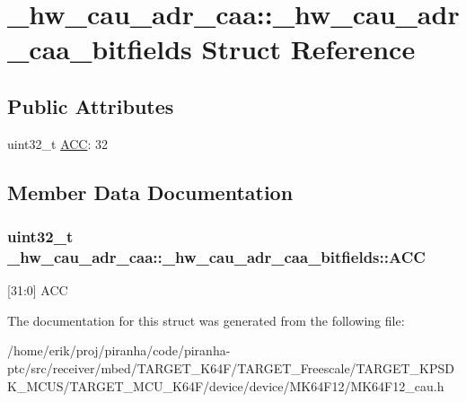 \hypertarget{struct__hw__cau__adr__caa_1_1__hw__cau__adr__caa__bitfields}{}\section{\+\_\+hw\+\_\+cau\+\_\+adr\+\_\+caa\+:\+:\+\_\+hw\+\_\+cau\+\_\+adr\+\_\+caa\+\_\+bitfields Struct Reference}
\label{struct__hw__cau__adr__caa_1_1__hw__cau__adr__caa__bitfields}
\subsection*{Public Attributes}
\begin{DoxyCompactItemize}
\item 
uint32\+\_\+t \hyperlink{struct__hw__cau__adr__caa_1_1__hw__cau__adr__caa__bitfields_ad5e67f03aef2965ab3c8c6d02ae842cf}{A\+CC}\+: 32
\end{DoxyCompactItemize}


\subsection{Member Data Documentation}
\subsubsection[{\texorpdfstring{A\+CC}{ACC}}]{\setlength{\rightskip}{0pt plus 5cm}uint32\+\_\+t \+\_\+hw\+\_\+cau\+\_\+adr\+\_\+caa\+::\+\_\+hw\+\_\+cau\+\_\+adr\+\_\+caa\+\_\+bitfields\+::\+A\+CC}\hypertarget{struct__hw__cau__adr__caa_1_1__hw__cau__adr__caa__bitfields_ad5e67f03aef2965ab3c8c6d02ae842cf}{}\label{struct__hw__cau__adr__caa_1_1__hw__cau__adr__caa__bitfields_ad5e67f03aef2965ab3c8c6d02ae842cf}
\mbox{[}31\+:0\mbox{]} A\+CC 

The documentation for this struct was generated from the following file\+:\begin{DoxyCompactItemize}
\item 
/home/erik/proj/piranha/code/piranha-\/ptc/src/receiver/mbed/\+T\+A\+R\+G\+E\+T\+\_\+\+K64\+F/\+T\+A\+R\+G\+E\+T\+\_\+\+Freescale/\+T\+A\+R\+G\+E\+T\+\_\+\+K\+P\+S\+D\+K\+\_\+\+M\+C\+U\+S/\+T\+A\+R\+G\+E\+T\+\_\+\+M\+C\+U\+\_\+\+K64\+F/device/device/\+M\+K64\+F12/M\+K64\+F12\+\_\+cau.\+h\end{DoxyCompactItemize}
